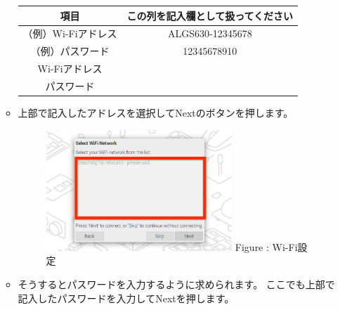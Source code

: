 \documentclass[a4paper,12pt]{jarticle}
\begin{document}
\begin{enumerate}
\begin{itemize}
\begin{table}[htbp]
                          \begin{tabular}{|c|c|}
                          \hline
                              項目&この列を記入欄として扱ってください  \\
                              \hline
                              （例）Wi-Fiアドレス& ALGS630-12345678\\
                              \hline
                              （例）パスワード& 12345678910\\
                              \hline
                              Wi-Fiアドレス& \\
                              \hline
                              パスワード& \\
                              \hline
                          \end{tabular}
                          \end{table}
                        \item     
                        上部で記入したアドレスを選択してNextのボタンを押します。
                        \begin{figure}[h]
                          \centering
                          \begin{minipage}{5.228cm}
                            {\upshape
                              \includegraphics[width=7.000cm]{sw_image06kai.png}
                              \newline
                              Figure {\theFigure\label{seq:refFigure16}}:
                              Wi-Fi設定}
                          \end{minipage}
                        \end{figure}
                \end{itemize}
                \begin{itemize}
                  \item
                      そうするとパスワードを入力するように求められます。 ここでも上部で記入したパスワードを入力してNextを押します。

\end{itemize}
\end{enumerate}
\end{document}
